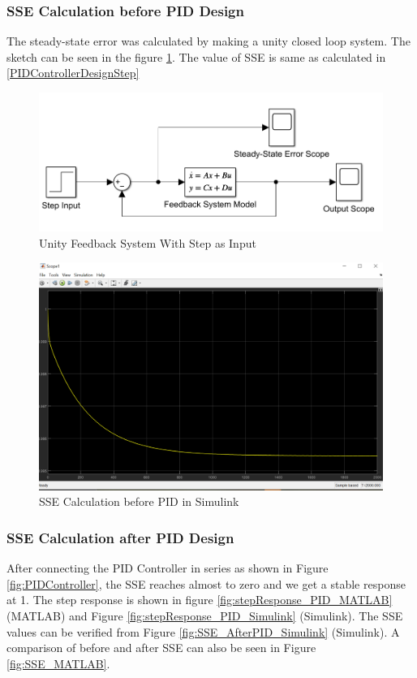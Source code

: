 \documentclass{article}
\begin{document}
\subsubsection{SSE Calculation before PID Design}
The steady-state error was calculated by making a unity closed loop system. The sketch can be seen in the figure \ref{fig:SSE_Sketch}. The value of SSE is same as calculated in \ref{PIDControllerDesignStep}

\begin{figure}[h!]
	\centering
	\includegraphics[scale=0.75]{images/SSE_Sketch.png}
	\caption{Unity Feedback System With Step as Input}
	\label{fig:SSE_Sketch}
\end{figure}

\begin{figure}[h!]
	\centering
	\includegraphics[scale=0.5]{images/SSE_BeforePID_Simulink.png}
	\caption{SSE Calculation before PID in Simulink}
	\label{fig:SSE_BeforePID_Simulink}
\end{figure}



\subsubsection{SSE Calculation after PID Design}
After connecting the PID Controller in series as shown in Figure \ref{fig:PIDController}, the SSE reaches almost to zero and we get a stable response at 1. The step response is shown in figure \ref{fig:stepResponse_PID_MATLAB} (MATLAB) and Figure \ref{fig:stepResponse_PID_Simulink} (Simulink). The SSE values can be verified from Figure \ref{fig:SSE_AfterPID_Simulink} (Simulink). A comparison of before and after SSE can also be seen in Figure \ref{fig:SSE_MATLAB}.
\end{document}
